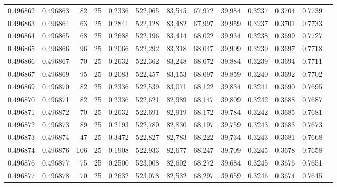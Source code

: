 \begin{tabular}{rrrrrrrrrrrrr}
0.496862 & 0.496863 &    82 &  25 &                                     0.2336 & 522,065 &  83,545 &  67,972 &  39,984 & 0.3237 & 0.3704 & 0.7739 \\
0.496863 & 0.496864 &    63 &  25 &                                     0.2841 & 522,128 &  83,482 &  67,997 &  39,959 & 0.3237 & 0.3701 & 0.7733 \\
0.496864 & 0.496865 &    68 &  25 &                                     0.2688 & 522,196 &  83,414 &  68,022 &  39,934 & 0.3238 & 0.3699 & 0.7727 \\
0.496865 & 0.496866 &    96 &  25 &                                     0.2066 & 522,292 &  83,318 &  68,047 &  39,909 & 0.3239 & 0.3697 & 0.7718 \\
0.496866 & 0.496867 &    70 &  25 &                                     0.2632 & 522,362 &  83,248 &  68,072 &  39,884 & 0.3239 & 0.3694 & 0.7711 \\
0.496867 & 0.496869 &    95 &  25 &                                     0.2083 & 522,457 &  83,153 &  68,097 &  39,859 & 0.3240 & 0.3692 & 0.7702 \\
0.496869 & 0.496870 &    82 &  25 &                                     0.2336 & 522,539 &  83,071 &  68,122 &  39,834 & 0.3241 & 0.3690 & 0.7695 \\
0.496870 & 0.496871 &    82 &  25 &                                     0.2336 & 522,621 &  82,989 &  68,147 &  39,809 & 0.3242 & 0.3688 & 0.7687 \\
0.496871 & 0.496872 &    70 &  25 &                                     0.2632 & 522,691 &  82,919 &  68,172 &  39,784 & 0.3242 & 0.3685 & 0.7681 \\
0.496872 & 0.496873 &    89 &  25 &                                     0.2193 & 522,780 &  82,830 &  68,197 &  39,759 & 0.3243 & 0.3683 & 0.7673 \\
0.496873 & 0.496874 &    47 &  25 &                                     0.3472 & 522,827 &  82,783 &  68,222 &  39,734 & 0.3243 & 0.3681 & 0.7668 \\
0.496874 & 0.496876 &   106 &  25 &                                     0.1908 & 522,933 &  82,677 &  68,247 &  39,709 & 0.3245 & 0.3678 & 0.7658 \\
0.496876 & 0.496877 &    75 &  25 &                                     0.2500 & 523,008 &  82,602 &  68,272 &  39,684 & 0.3245 & 0.3676 & 0.7651 \\
0.496877 & 0.496878 &    70 &  25 &                                     0.2632 & 523,078 &  82,532 &  68,297 &  39,659 & 0.3246 & 0.3674 & 0.7645 \\

\end{tabular}
